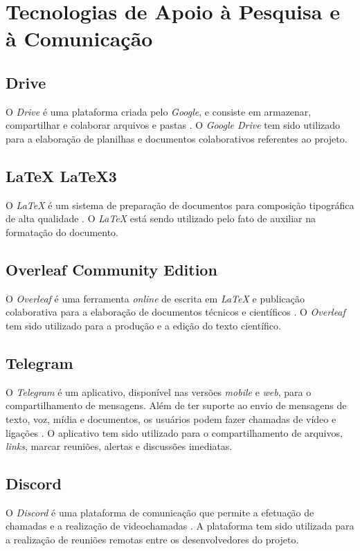 \section{Tecnologias de Apoio à Pesquisa e à Comunicação}

\label{tec_apoio_pesquisa_comunicacao}

\subsection{Drive}
O \textit{Drive} é uma plataforma criada pelo \textit{Google}, e consiste em armazenar, compartilhar e colaborar arquivos e pastas \cite{drive}. O \textit{Google Drive} tem sido utilizado para a elaboração de planilhas e documentos colaborativos referentes ao projeto.

\subsection{LaTeX LaTeX3}
O \textit{LaTeX} é um sistema de preparação de documentos para composição tipográfica de alta qualidade \cite{latex}. O \textit{LaTeX} está sendo utilizado pelo fato de auxiliar na formatação do documento.

\subsection{Overleaf Community Edition}
O \textit{Overleaf} é uma ferramenta \textit{online} de escrita em \textit{LaTeX} e publicação colaborativa para a elaboração de documentos técnicos e científicos \cite{overleaf}. O \textit{Overleaf} tem sido utilizado para a produção e a edição do texto científico.

\subsection{Telegram}
O \textit{Telegram} é um aplicativo, disponível nas versões \textit{mobile} e \textit{web}, para o compartilhamento de mensagens. Além de ter suporte ao envio de mensagens de texto, voz, mídia e documentos, os usuários podem fazer chamadas de vídeo e ligações \cite{telegram}. O aplicativo tem sido utilizado para o compartilhamento de arquivos, \textit{links}, marcar reuniões, alertas e discussões imediatas.

\subsection{Discord}
O \textit{Discord} é uma plataforma de comunicação que permite a efetuação de chamadas e a realização de videochamadas \cite{discord}. A plataforma tem sido utilizada para a realização de reuniões remotas entre os desenvolvedores do projeto.

